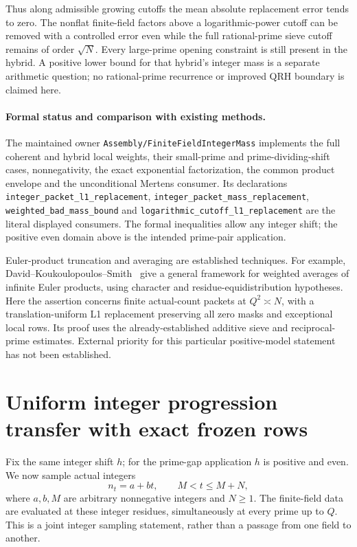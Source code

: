 \documentclass[11pt]{article}
\begin{document}
Thus along admissible growing cutoffs the mean absolute replacement
error tends to zero. The nonflat finite-field factors above a
logarithmic-power cutoff can be removed with a controlled error even
while the full rational-prime sieve cutoff remains of order \(\sqrt N\).
Every large-prime opening constraint is still present in the hybrid.
A positive lower bound for that hybrid's integer mass is a separate
arithmetic question; no rational-prime recurrence or improved QRH
boundary is claimed here.

\paragraph{Formal status and comparison with existing methods.}
The maintained owner \texttt{Assembly/FiniteFieldIntegerMass} implements
the full coherent and hybrid local weights, their small-prime and
prime-dividing-shift cases, nonnegativity, the exact exponential
factorization, the common product envelope and the unconditional
Mertens consumer. Its declarations
\texttt{integer\_packet\_l1\_replacement},
\texttt{integer\_packet\_mass\_replacement},
\texttt{weighted\_bad\_mass\_bound} and
\texttt{logarithmic\_cutoff\_l1\_replacement}
are the literal displayed consumers. The formal inequalities allow any
integer shift; the positive even domain above is the intended
prime-pair application.

Euler-product truncation and averaging are established techniques.
For example, David--Koukoulopoulos--Smith~\cite{DavidKoukoulopoulosSmith}
give a general framework for weighted averages of infinite Euler
products, using character and residue-equidistribution hypotheses.
Here the assertion concerns finite actual-count packets at
\(Q^2\asymp N\), with a translation-uniform L1 replacement preserving
all zero masks and exceptional local rows. Its proof uses the
already-established additive sieve and reciprocal-prime estimates.
External priority for this particular positive-model statement
has not been established.

\section{Uniform integer progression transfer with exact frozen rows}
\label{sec:affineIntegerTransfer}

Fix the same integer shift \(h\); for the prime-gap application \(h\)
is positive and even. We now sample actual integers
\[
                 n_t=a+bt,\qquad M<t\leq M+N,
\]
where \(a,b,M\) are arbitrary nonnegative integers and \(N\geq1\).
The finite-field data are evaluated at these integer residues,
simultaneously at every prime up to \(Q\). This is a joint integer
sampling statement, rather than a passage from one field to another.
\end{document}
